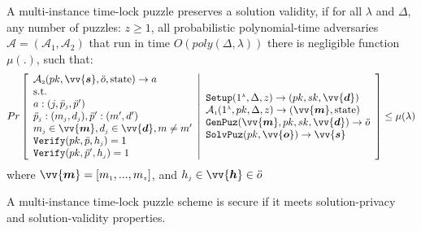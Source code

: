 \begin{definition}\label{Def::Solution-Validity}
A multi-instance time-lock puzzle preserves a   solution validity,   if  for all $\lambda$ and  $\Delta$,  any number of puzzles: $z\geq1$, all probabilistic polynomial-time adversaries $\mathcal{A}=(\mathcal{A}_{\scriptscriptstyle 1},\mathcal{A}_{\scriptscriptstyle 2})$ that run in  time $O(poly(\Delta,\lambda))$ there is  negligible function $\mu(.)$, such that: 
\small{
$$ Pr\left[
    \begin{array}{l}
 \mathcal{A}_{\scriptscriptstyle 2}(pk,\vv{\bm{s}}, \ddot{o},\text{state})\rightarrow a\\ 
 
 \text{s.t.}\\ 
a:(j,\ddot{p}_{\scriptscriptstyle j} ,\ddot{p}')\\
 \ddot{p}_{\scriptscriptstyle j}: (m_{\scriptscriptstyle j},d_{\scriptscriptstyle j}), 
\ddot{p}':(m',d') \\
 m_{\scriptscriptstyle j}\in \vv{{\bm{m}}}, d_{\scriptscriptstyle j}\in\vv{{\bm{d}}},
m\neq m'\\
\mathtt {Verify}(pk,\ddot{p},h_{\scriptscriptstyle j})= 1\\
\mathtt {Verify}(pk,\ddot{p}',h_{\scriptscriptstyle j})= 1\\
\end{array} 
\middle |
\begin{array}{l}

\mathtt{Setup}(1^{\scriptscriptstyle\lambda},\Delta,z)\rightarrow (pk,sk,\vv{\bm{d}})\\
\mathcal{A}_{\scriptscriptstyle 1}(1^{\scriptscriptstyle\lambda},pk, \Delta,z)\rightarrow (\vv{{\bm{m}}},\text{state})\\

\mathtt {GenPuz}(\vv{{\bm{m}}}, pk, sk,\vv{\bm{d}})\rightarrow \ddot{o} \\
\mathtt {SolvPuz}(pk,\vv{\bm{o}})\rightarrow \vv{\bm{s}}

\end{array} 
   \right]\leq  \mu(\lambda)$$
   }
where $\vv{{\bm{m}}}=[m_{\scriptscriptstyle 1},...,m_{\scriptscriptstyle z}]$, and $h_{\scriptscriptstyle j}\in \vv{\bm{h}}\in \ddot{o}$
\end{definition}


% 
\begin{definition}\label{def::C-TLP-security} A multi-instance time-lock puzzle scheme  is secure if it meets solution-privacy and solution-validity properties. 
\end{definition}

